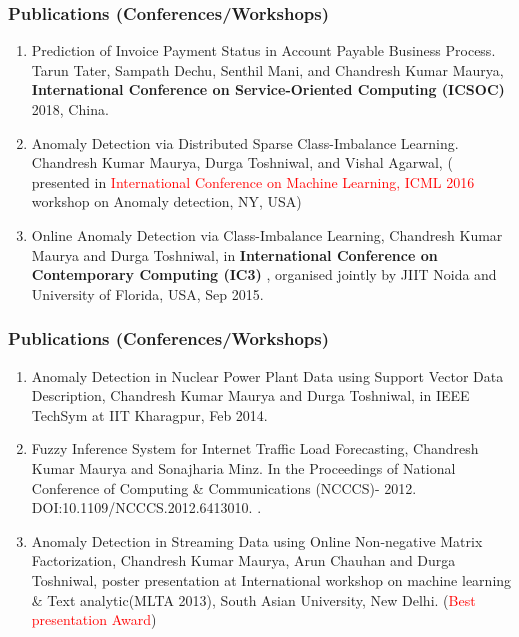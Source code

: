 \documentclass[blue]{beamer}
\begin{document}
\begin{frame}
\frametitle{Publications (Conferences/Workshops)}

\begin{enumerate} 
\item 
Prediction of Invoice Payment Status in Account Payable Business Process. Tarun Tater, Sampath Dechu, Senthil Mani, and Chandresh Kumar Maurya, {\bf International Conference on Service-Oriented Computing (ICSOC)} 2018, China.

\item
 Anomaly Detection via Distributed Sparse Class-Imbalance Learning. Chandresh Kumar Maurya, Durga Toshniwal, and  Vishal Agarwal, ( presented in \textcolor{red}{International Conference on Machine Learning, ICML 2016} workshop on Anomaly detection, NY, USA)


\item
Online Anomaly Detection via Class-Imbalance Learning, Chandresh Kumar Maurya and Durga Toshniwal,  in  {\bf International Conference on Contemporary Computing (IC3)} , organised jointly by JIIT Noida and University of Florida, USA, Sep 2015.

\end{enumerate}
\end{frame}

\begin{frame}
\frametitle{Publications (Conferences/Workshops)}

\begin{enumerate} 


\item
 Anomaly Detection in Nuclear Power Plant Data using Support Vector Data Description, Chandresh Kumar Maurya and Durga Toshniwal, in  IEEE TechSym at IIT Kharagpur, Feb 2014.

\item  Fuzzy Inference System for Internet Traffic Load Forecasting, Chandresh Kumar Maurya and Sonajharia Minz. In the Proceedings of National Conference of Computing \& Communications (NCCCS)-
2012. DOI:10.1109/NCCCS.2012.6413010. .

\item
Anomaly Detection in Streaming Data using Online Non-negative Matrix Factorization, Chandresh Kumar Maurya, Arun Chauhan and Durga Toshniwal, poster presentation at International workshop on machine learning \& Text analytic(MLTA 2013), South Asian University, New Delhi.  (\textcolor{red}{Best  presentation Award})
\end{enumerate}
\end{frame}
\end{document}
